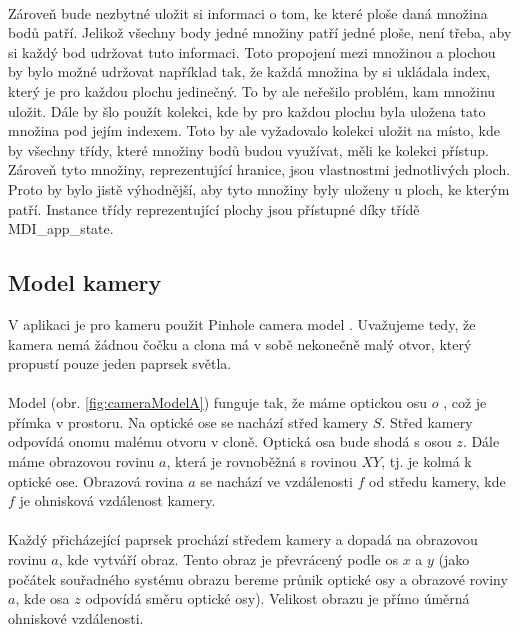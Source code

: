 \documentclass[11pt,twoside,a4paper]{book}
\begin{document}
\paragraph{}
Zároveň bude nezbytné uložit si informaci o tom, ke které ploše daná množina bodů patří. Jelikož všechny body jedné množiny patří jedné ploše, není třeba, aby si každý bod udržovat tuto informaci. Toto propojení mezi množinou a plochou by bylo možné udržovat například tak, že každá množina by si ukládala index, který je pro každou plochu jedinečný. To by ale neřešilo problém, kam množinu uložit. Dále by šlo použít kolekci, kde by pro každou plochu byla uložena tato množina pod jejím indexem. Toto by ale vyžadovalo kolekci uložit na místo, kde by všechny třídy, které množiny bodů budou využívat, měli ke kolekci přístup. Zároveň tyto množiny, reprezentující hranice, jsou vlastnostmi jednotlivých ploch. Proto by bylo jistě výhodnější, aby tyto množiny byly uloženy u ploch, ke kterým patří. Instance třídy reprezentující plochy jsou přístupné díky třídě MDI\_app\_state.

\subsection{Model kamery}
\label{modelKamery}
V aplikaci je pro kameru použit Pinhole camera model\cite{MultipleViewGeometry} \cite{CameraModel}.  Uvažujeme tedy, že kamera nemá žádnou čočku a clona má v sobě nekonečně malý otvor, který propustí pouze jeden paprsek světla. 
\paragraph{}
Model (obr. \ref{fig:cameraModelA}) funguje tak, že máme optickou osu $o$ , což je přímka v prostoru. Na optické ose se nachází střed kamery $S$. Střed kamery odpovídá onomu malému otvoru v cloně. Optická osa bude shodá s osou $z$. Dále máme obrazovou rovinu $a$, která je rovnoběžná s rovinou $XY$, tj. je kolmá k optické ose. Obrazová rovina $a$ se nachází ve vzdálenosti $f$ od středu kamery, kde $f$ je ohnisková vzdálenost kamery.
\paragraph{}
Každý přicházející paprsek prochází středem kamery a dopadá na obrazovou rovinu $a$, kde vytváří obraz. Tento obraz je převrácený podle os $x$ a $y$ (jako počátek souřadného systému obrazu bereme průnik optické osy a obrazové roviny $a$, kde osa $z$ odpovídá směru optické osy). Velikost obrazu je přímo úměrná ohniskové vzdálenosti.
\end{document}
